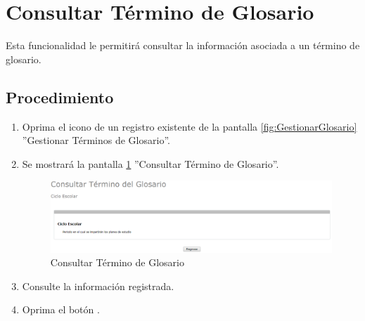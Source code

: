 \hypertarget{cv:consultarTermino}{\section{Consultar Término de Glosario}} \label{sec:consultarTermino}

	Esta funcionalidad le permitirá consultar la información asociada a un término de glosario.

		\subsection{Procedimiento}

			\begin{enumerate}
	
			\item Oprima el icono \IUConsultar{} de un registro existente de la pantalla \ref{fig:GestionarGlosario} ''Gestionar Términos de Glosario''.
	
			\item Se mostrará la pantalla \ref{fig:consultarTermino} ''Consultar Término de Glosario''.
			
			\begin{figure}[htbp!]
				\begin{center}
					\includegraphics[scale=0.6]{roles/lider/glosario/pantallas/IU6-4consultarTermino}
					\caption{Consultar Término de Glosario}
					\label{fig:consultarTermino}
				\end{center}
			\end{figure}
						
			\item Consulte la información registrada.
			
			\item Oprima el botón \IURegresar.
		\end{enumerate}